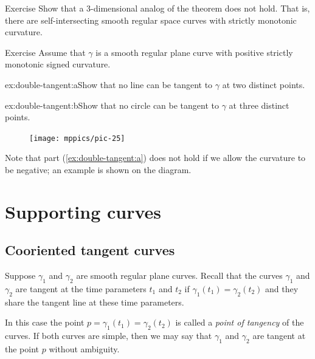 \begin{thm}{Exercise}\label{ex:3D-spiral}
Show that a 3-dimensional analog of the theorem does not hold.
That is, there are self-intersecting smooth regular space curves with strictly monotonic curvature.
\end{thm}

\begin{thm}{Exercise}\label{ex:double-tangent}
Assume that $\gamma$ is a smooth regular plane curve with positive strictly monotonic signed curvature.

\begin{subthm}{ex:double-tangent:a}Show that no line can be tangent to $\gamma$ at two distinct points.
\end{subthm}

\begin{subthm}{ex:double-tangent:b}Show that no circle can be tangent to $\gamma$ at three distinct points. 
\end{subthm}

\end{thm} %

{

\begin{figure}
\vskip-4mm
\centering
\texttt{[image: mppics/pic-25]}
\vskip0mm
\end{figure}

Note that part (\ref{ex:double-tangent:a}) does not hold if we allow the curvature to be negative; an example is shown on the diagram.

}

\chapter{Supporting curves}

\section*{Cooriented tangent curves}

Suppose $\gamma_1$ and $\gamma_2$ are smooth regular plane curves.
Recall that the curves $\gamma_1$ and $\gamma_2$ are tangent at the  time parameters $t_1$ and $t_2$
if $\gamma_1(t_1)=\gamma_2(t_2)$
and they share the tangent line at these time parameters.

In this case the point $p=\gamma_1(t_1)=\gamma_2(t_2)$ is called a \emph{point of tangency} of the curves.
If both curves are simple, then we may say that $\gamma_1$ and $\gamma_2$ are tangent at the point $p$ 
without ambiguity.

